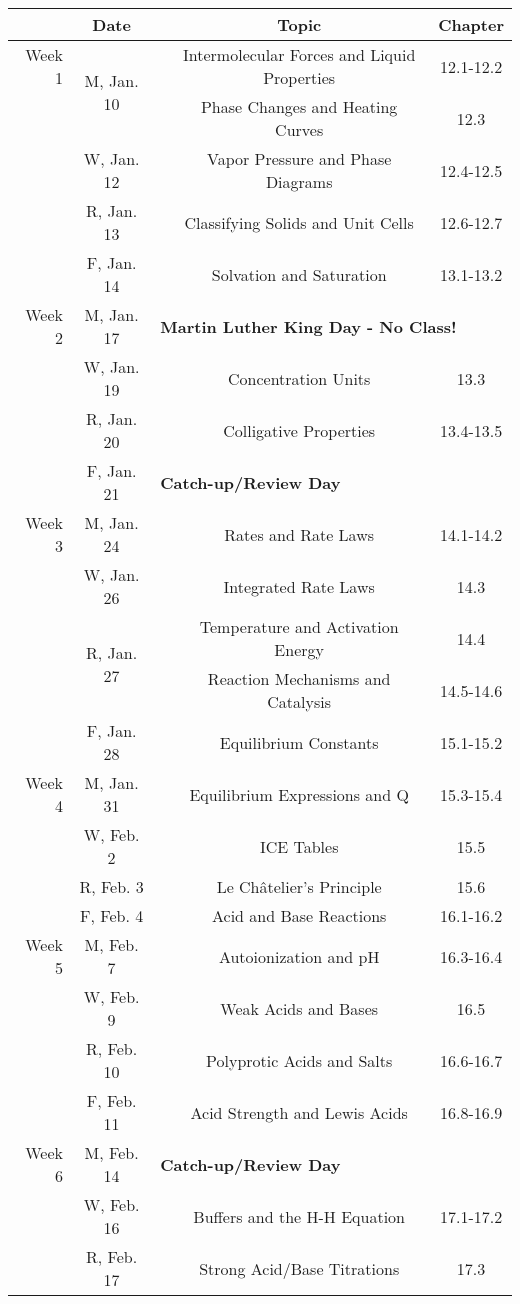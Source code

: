 \begin{tabular}{rcccc}
& Date && Topic & Chapter\\
\midrule
Week 1 & \multirow{2}{*}{M, Jan. 10}& & Intermolecular Forces and Liquid Properties & 12.1-12.2\\
& & & Phase Changes and Heating Curves & 12.3\\
& W, Jan. 12&& Vapor Pressure and Phase Diagrams & 12.4-12.5\\
& R, Jan. 13&& Classifying Solids and Unit Cells & 12.6-12.7\\
& F, Jan. 14&& Solvation and Saturation & 13.1-13.2\\
\midrule
Week 2 & M, Jan. 17& \multicolumn{3}{l}{\textbf{Martin Luther King Day - No Class!}}\\
& W, Jan. 19&& Concentration Units & 13.3\\
& R, Jan. 20&& Colligative Properties & 13.4-13.5\\
& F, Jan. 21& \multicolumn{3}{l}{\textbf{Catch-up/Review Day}}\\
\midrule
Week 3 & M, Jan. 24&& Rates and Rate Laws & 14.1-14.2\\
& W, Jan. 26&& Integrated Rate Laws & 14.3\\
& \multirow{2}{*}{R, Jan. 27}& & Temperature and Activation Energy & 14.4\\
& & & Reaction Mechanisms and Catalysis & 14.5-14.6\\
& F, Jan. 28&& Equilibrium Constants & 15.1-15.2\\
\midrule
Week 4 & M, Jan. 31&& Equilibrium Expressions and Q & 15.3-15.4\\
& W, Feb. 2&& ICE Tables & 15.5\\
& R, Feb. 3&& Le Ch\^atelier's Principle & 15.6\\
& F, Feb. 4&& Acid and Base Reactions & 16.1-16.2\\
\midrule
Week 5 & M, Feb. 7&& Autoionization and pH & 16.3-16.4\\
& W, Feb. 9&& Weak Acids and Bases & 16.5\\
& R, Feb. 10&& Polyprotic Acids and Salts & 16.6-16.7\\
& F, Feb. 11&& Acid Strength and Lewis Acids & 16.8-16.9\\
\midrule
Week 6 & M, Feb. 14& \multicolumn{3}{l}{\textbf{Catch-up/Review Day}}\\
& W, Feb. 16&& Buffers and the H-H Equation & 17.1-17.2\\
& R, Feb. 17&& Strong Acid/Base Titrations & 17.3\\

\end{tabular}
